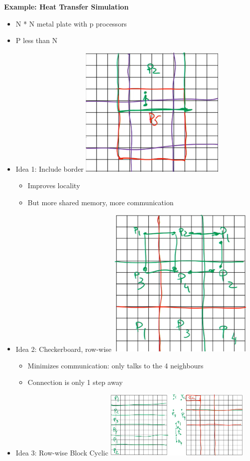 \documentclass[10pt, landscape]{article}
\begin{document}
\begin{multicols}{4}
\textbf{Example: Heat Transfer Simulation}
\begin{itemize}
    \item N * N metal plate with p processors 
    \item P less than N 
    \item Idea 1: Include border 
    \includegraphics*[width=7cm]{heat_plate1.png}
    \begin{itemize}
        \item Improves locality 
        \item But more shared memory, more communication
    \end{itemize}
    \item Idea 2: Checkerboard, row-wise 
    \includegraphics*[width=7cm]{heat_plate2.png}
    \begin{itemize}
        \item Minimizes communication: only talks to the 4 neighbours
        \item Connection is only 1 step away 
    \end{itemize}
    \item Idea 3: Row-wise Block Cyclic 
    \includegraphics*[width=7cm]{heat_plate3.png}

\end{itemize}
\end{multicols}
\end{document}
